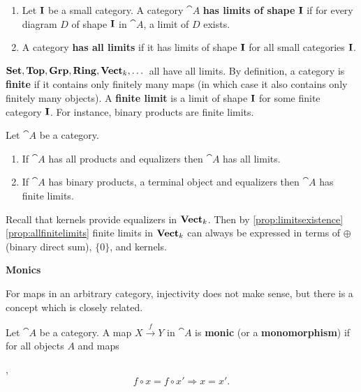 \begin{definition}
    \begin{enumerate}[label=(\alph*)]
        \item Let $\mathbf{I}$ be a small category. A category $\cat{A}$ \textbf{has limits of shape} $\mathbf{I}$ if for every diagram $D$ of shape $\mathbf{I}$ in $\cat{A}$, a limit of $D$ exists.
        \item A category \textbf{has all limits} if it has limits of shape $\mathbf{I}$ for all small categories $\mathbf{I}$.
    \end{enumerate}
\end{definition}

$\mathbf{Set}, \mathbf{Top}, \mathbf{Grp}, \mathbf{Ring}, \mathbf{Vect}_k,\dots$ all have all limits. By definition, a category is \textbf{finite} if it contains only finitely many maps (in which case it also contains only finitely many objects). A \textbf{finite limit} is a limit of shape $\mathbf{I}$ for some finite category $\mathbf{I}$. For instance, binary products are finite limits.

\begin{proposition}\label{prop:limitsexistence}
    Let $\cat{A}$ be a category.
    \begin{enumerate}[label=(\alph*)]
        \item\label{prop:alllimits} If $\cat{A}$ has all products and equalizers then $\cat{A}$ has all limits.
        \item\label{prop:allfinitelimits} If $\cat{A}$ has binary products, a terminal object and equalizers then $\cat{A}$ has finite limits.
    \end{enumerate}
\end{proposition}

\begin{example}
    Recall that kernels provide equalizers in $\mathbf{Vect}_k$. Then by \ref{prop:limitsexistence}\ref{prop:allfinitelimits} finite limits in $\mathbf{Vect}_k$ can always be expressed in terms of $\oplus$ (binary direct sum), $\{0\}$, and kernels.
\end{example}

\begin{center}
    \textbf{Monics}
\end{center}
For maps in an arbitrary category, injectivity does not make sense, but there is a concept which is closely related.

\begin{definition}
    Let $\cat{A}$ be a category. A map $X\xrightarrow{f}Y$ in $\cat{A}$ is \textbf{monic} (or a \textbf{monomorphism}) if for all objects $A$ and maps ,
    \begin{equation*}
        f\circ x=f\circ x' \Rightarrow x=x'.
    \end{equation*}
\end{definition}

